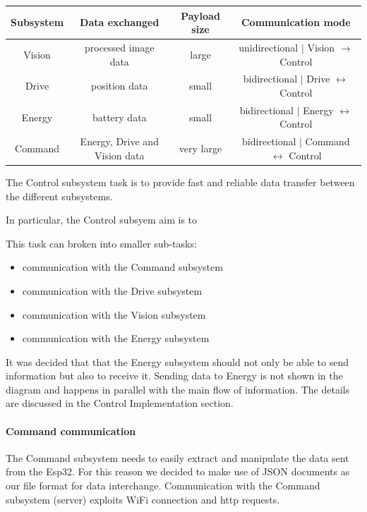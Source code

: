 \documentclass[10pt,twoside]{article}
\begin{document}
\begin{center}
\begin{tabular}{ |c|c|c|c| } 
\hline
Subsystem & Data exchanged & Payload size & Communication mode \\
\hline
\multirow{1}{4em}{Vision} & processed image data & large & unidirectional $\vert$ Vision $\rightarrow$ Control \\ 

\multirow{1}{4em}{Drive} & position data & small & bidirectional $\vert$ Drive $\leftrightarrow$ Control \\ 

\multirow{1}{4em}{Energy} & battery data & small & bidirectional $\vert$ Energy $\leftrightarrow$ Control \\ 

\multirow{1}{4em}{Command} & Energy, Drive and Vision data & very large & bidirectional $\vert$ Command $\leftrightarrow$ Control \\



\hline
\end{tabular}
\end{center}




The Control subsystem task is to provide fast and reliable data
transfer between the different subsystems. 
\medskip

In particular, the Control subsyem aim is to 

This task can broken into smaller sub-tasks:
\begin{itemize}
    \item communication with the Command subsystem
    \item communication with the Drive subsystem
    \item communication with the Vision subsystem
    \item communication with the Energy subsystem
\end{itemize}





It was decided that that the Energy subsystem should not only be able to send information but also to receive it. Sending data to Energy is not shown in the diagram and happens in parallel with the main flow of information. The details are discussed in the Control Implementation section.

\paragraph{Command communication}
The Command subsystem needs to easily extract and manipulate the data sent from the Esp32. For this reason we decided to make use of JSON documents as our file format for data interchange. Communication with the Command subsystem (server) exploits WiFi connection and http requests.
\end{document}
